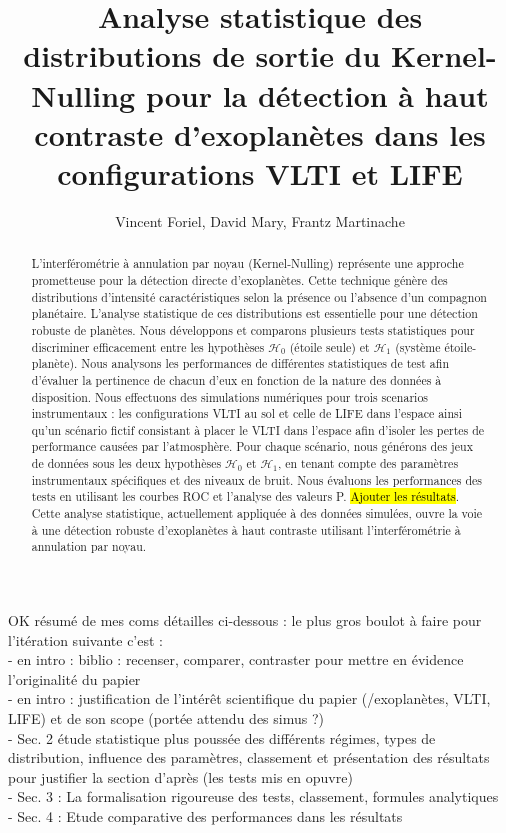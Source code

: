 \documentclass{article}
\title{Analyse statistique des distributions de sortie du Kernel-Nulling pour la détection à haut contraste d'exoplanètes dans les configurations VLTI et LIFE}
\author{Vincent Foriel,
        David Mary,
        Frantz Martinache
       }
\newcommand{\dm}[1]{{\color{mulberry} #1}}
\begin{document}
\maketitle

\begin{abstract}
L'interférométrie à annulation par noyau (Kernel-Nulling) représente une approche prometteuse pour la détection directe d'exoplanètes. Cette technique génère des distributions d'intensité caractéristiques selon la présence ou l'absence d'un compagnon planétaire. L'analyse statistique de ces distributions est essentielle pour une détection robuste de planètes. Nous développons et comparons plusieurs tests statistiques pour discriminer efficacement entre les hypothèses $\mathcal{H}_0$ (étoile seule) et $\mathcal{H}_1$ (système étoile-planète). Nous analysons les performances de différentes statistiques de test afin d'évaluer la pertinence de chacun d'eux en fonction de la nature des données à disposition. Nous effectuons des simulations numériques pour trois scenarios instrumentaux : les configurations VLTI au sol et celle de LIFE dans l'espace ainsi qu'un scénario fictif consistant à placer le VLTI dans l'espace afin d'isoler les pertes de performance causées par l'atmosphère. Pour chaque scénario, nous générons des jeux de données sous les deux hypothèses $\mathcal{H}_0$ et $\mathcal{H}_1$, en tenant compte des paramètres instrumentaux spécifiques et des niveaux de bruit. Nous évaluons les performances des tests en utilisant les courbes ROC et l'analyse des valeurs P. \hl{Ajouter les résultats}. Cette analyse statistique, actuellement appliquée à des données simulées, ouvre la voie à une détection robuste d'exoplanètes à haut contraste utilisant l'interférométrie à annulation par noyau.
\end{abstract}


\dm{OK résumé de mes coms détailles ci-dessous : le plus gros boulot à faire pour l'itération suivante c'est : \\
- en intro : biblio : recenser, comparer, contraster pour mettre en évidence l'originalité du papier\\
- en intro : justification de l'intérêt scientifique du papier (/exoplanètes, VLTI, LIFE) et de son scope (portée attendu des simus ?) \\
- Sec. 2 étude statistique plus poussée des différents régimes, types de distribution, influence des paramètres, classement et présentation des résultats pour justifier la section d'après (les tests mis en opuvre)\\
- Sec. 3 : La formalisation rigoureuse des tests, classement, formules analytiques \\
- Sec. 4 : Etude comparative des performances dans les résultats }
\end{document}
